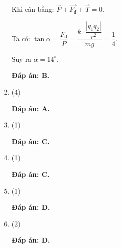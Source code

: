 \begin{enumerate}[label=\bfseries Câu \arabic*:]
{		Khi cân bằng: $\vec{P}+\vec{F_\text{đ}}+\vec{T}=0$.
		
		Ta có: $\tan \alpha= \dfrac{F_\text{đ}}{P}=\dfrac{k\cdot\dfrac{|q_1q_2|}{r^2}}{mg}=\dfrac{1}{4}$.
		
		Suy ra $\alpha= 14^\circ$.
		
				
		\textbf{Đáp án: B.}
	}

\item {}
	
	\cauhoi
	{
	
	\begin{mcq}(4)

	\end{mcq}
	}

	\loigiai
	{
		
		\textbf{Đáp án: A.}
	}

\item {}
	
	\cauhoi
	{
	
	\begin{mcq}(1)
		
	\end{mcq}	
	}

	\loigiai
	{
		
		\textbf{Đáp án: C.}
	}

\item {}
	
	\cauhoi
	{
		\begin{mcq}(1)
		
		\end{mcq}
	}

	\loigiai
	{
		
		
		\textbf{Đáp án: C.}
	}

\item {}
	
	\cauhoi
	{
		\begin{mcq}(1)
			
		\end{mcq}
	}

	\loigiai
	{
		
		\textbf{Đáp án: D.}
	}

\item {}
	
	\cauhoi
	{
		\begin{mcq}(2)

		\end{mcq}
	}

	\loigiai
	{
	
		\textbf{Đáp án: D.}
	}


\end{enumerate}
